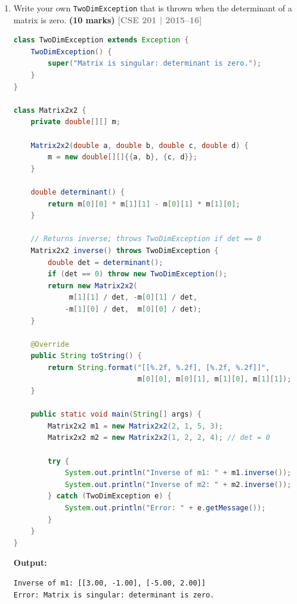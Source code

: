 \documentclass[12pt,a3paper]{article}
\newcommand{\yr}[1]{\hfill\textcolor{gray}{\small\textbf{[#1]}}}
\newcommand{\mk}[1]{\textcolor{orange!70!black}{\small\textbf{(#1 marks)}}}
\begin{document}
\begin{enumerate}
\begin{tcolorbox}
\begin{lstlisting}[language=Java]
        if (!correctUsername.equals(username) || !correctPassword.equals(password)) {
            // Throwing the custom exception on failure
            throw new AuthFailureException("Authentication failed: Invalid credentials for user '" + username + "'.");
        }

        System.out.println("Authentication successful for user: " + username);
    }
}
\end{lstlisting}

\end{tcolorbox}

\item Write your own \texttt{TwoDimException} that is thrown when the determinant of a matrix is zero. \mk{10}
\yr{CSE 201 | 2015--16}

\begin{tcolorbox}[enhanced,breakable,ansbox,
  colback=cE!4,colframe=cE,boxrule=0.8pt,arc=5pt,
  title={\textbf{Answer --- TwoDimException for Zero Determinant}},
  fonttitle=\bfseries\color{white},colbacktitle=cE]
\begin{lstlisting}[language=Java]
class TwoDimException extends Exception {
    TwoDimException() {
        super("Matrix is singular: determinant is zero.");
    }
}

class Matrix2x2 {
    private double[][] m;

    Matrix2x2(double a, double b, double c, double d) {
        m = new double[][]{{a, b}, {c, d}};
    }

    double determinant() {
        return m[0][0] * m[1][1] - m[0][1] * m[1][0];
    }

    // Returns inverse; throws TwoDimException if det == 0
    Matrix2x2 inverse() throws TwoDimException {
        double det = determinant();
        if (det == 0) throw new TwoDimException();
        return new Matrix2x2(
             m[1][1] / det, -m[0][1] / det,
            -m[1][0] / det,  m[0][0] / det);
    }

    @Override
    public String toString() {
        return String.format("[[%.2f, %.2f], [%.2f, %.2f]]",
                             m[0][0], m[0][1], m[1][0], m[1][1]);
    }

    public static void main(String[] args) {
        Matrix2x2 m1 = new Matrix2x2(2, 1, 5, 3);
        Matrix2x2 m2 = new Matrix2x2(1, 2, 2, 4); // det = 0

        try {
            System.out.println("Inverse of m1: " + m1.inverse());
            System.out.println("Inverse of m2: " + m2.inverse());
        } catch (TwoDimException e) {
            System.out.println("Error: " + e.getMessage());
        }
    }
}
\end{lstlisting}
\textbf{Output:}
\begin{verbatim}
Inverse of m1: [[3.00, -1.00], [-5.00, 2.00]]
Error: Matrix is singular: determinant is zero.
\end{verbatim}
\end{tcolorbox}




\end{enumerate}
\end{document}
